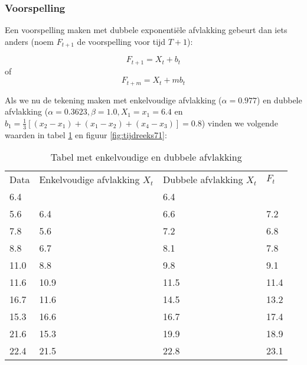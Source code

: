 \subsubsection{Voorspelling}

Een voorspelling maken met dubbele exponentiële afvlakking gebeurt dan iets anders (noem $F_{t+1}$ de voorspelling voor tijd $T+1$):

\[ F_{t+1} = X_{t} + b_{t} \]
of
\[ F_{t+m} = X_{t} + m b_{t} \]

Als we nu de tekening maken met enkelvoudige afvlakking ($\alpha = 0.977$) en dubbele afvlakking ($\alpha = 0.3623, \beta = 1.0, X_{1} = x_{1} = 6.4$ en $b_{1} = \frac{1}{3}\left[ (x_{2} - x_{1}) + (x_{1} - x_{2}) + (x_{4} - x_{3}) \right] = 0.8$) vinden we volgende waarden in tabel \ref{tab:doubleSingle} en figuur \ref{fig:tijdreeks71}:

\begin{table}
  \centering
  \begin{tabular}{|llll|}
    \hline
    Data & Enkelvoudige afvlakking $X_{t}$ & Dubbele afvlakking $X_{t}$ & $F_{t}$ \\
    6.4  & ~                      & 6.4              & ~                             \\
    5.6  & 6.4                    & 6.6              & 7.2                           \\
    7.8  & 5.6                    & 7.2              & 6.8                           \\
    8.8  & 6.7                    & 8.1              & 7.8                           \\
    11.0 & 8.8                    & 9.8              & 9.1                           \\
    11.6 & 10.9                   & 11.5             & 11.4                          \\
    16.7 & 11.6                   & 14.5             & 13.2                          \\
    15.3 & 16.6                   & 16.7             & 17.4                          \\
    21.6 & 15.3                   & 19.9             & 18.9                          \\
    22.4 & 21.5                   & 22.8             & 23.1                          \\ \hline
  \end{tabular}
  \caption{Tabel met enkelvoudige en dubbele afvlakking}
  \label{tab:doubleSingle}
\end{table}

